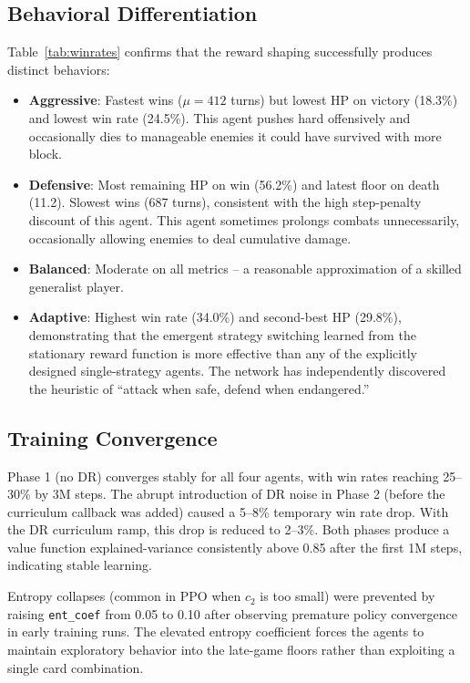 \subsection{Behavioral Differentiation}

Table~\ref{tab:winrates} confirms that the reward shaping successfully produces distinct behaviors:
\begin{itemize}
    \item \textbf{Aggressive}: Fastest wins ($\mu = 412$ turns) but lowest HP on victory (18.3\%) and lowest win rate (24.5\%). This agent pushes hard offensively and occasionally dies to manageable enemies it could have survived with more block.
    \item \textbf{Defensive}: Most remaining HP on win (56.2\%) and latest floor on death (11.2). Slowest wins (687 turns), consistent with the high step-penalty discount of this agent. This agent sometimes prolongs combats unnecessarily, occasionally allowing enemies to deal cumulative damage.
    \item \textbf{Balanced}: Moderate on all metrics -- a reasonable approximation of a skilled generalist player.
    \item \textbf{Adaptive}: Highest win rate (34.0\%) and second-best HP (29.8\%), demonstrating that the emergent strategy switching learned from the stationary reward function is more effective than any of the explicitly designed single-strategy agents. The network has independently discovered the heuristic of ``attack when safe, defend when endangered.''
\end{itemize}

\subsection{Training Convergence}

Phase 1 (no DR) converges stably for all four agents, with win rates reaching 25--30\% by 3M steps. The abrupt introduction of DR noise in Phase 2 (before the curriculum callback was added) caused a 5--8\% temporary win rate drop. With the DR curriculum ramp, this drop is reduced to 2--3\%. Both phases produce a value function explained-variance consistently above 0.85 after the first 1M steps, indicating stable learning.

Entropy collapses (common in PPO when $c_2$ is too small) were prevented by raising \texttt{ent\_coef} from 0.05 to 0.10 after observing premature policy convergence in early training runs. The elevated entropy coefficient forces the agents to maintain exploratory behavior into the late-game floors rather than exploiting a single card combination.

